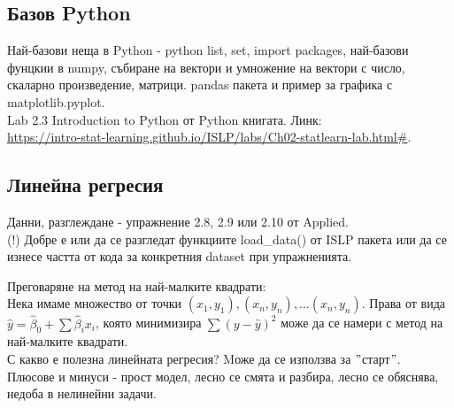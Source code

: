  	\subsection{Базов Python}
 	Най-базови неща в Python - python list, set, import packages, най-базови фунцкии в numpy,
 	събиране на вектори и умножение на вектори с число, скаларно произведение, матрици.
 	pandas пакета и пример за графика с matplotlib.pyplot.\\
 	
 	Lab 2.3 Introduction to Python от Python книгата. Линк: \\

 	\href{https://intro-stat-learning.github.io/ISLP/labs/Ch02-statlearn-lab.html#}{https://intro-stat-learning.github.io/ISLP/labs/Ch02-statlearn-lab.html\#}.
 	
	\subsection{Линейна регресия}
	
	
	
	Данни, разглеждане - упражнение 2.8, 2.9 или 2.10 от Applied. \\
	(!) Добре е или да се разгледат функциите load\_data() от ISLP пакета или
	да се изнесе частта от кода за конкретния dataset при упражненията.
	
	Преговаряне на метод на най-малките квадрати: \\
	Нека имаме множество от точки $(x_1,y_1), (x_n,y_n), \dots (x_n,y_n)$. 
	Права от вида $\hat y = \hat \beta_0 + \sum \hat \beta_i  x_i $, която минимизира $\sum (y-\hat{y})^2$  може да се намери с метод на най-малките квадрати. \\
	С какво е полезна линейната регресия? Mоже да се използва за $"$старт$"$.\\
	Плюсове и минуси - прост модел, лесно се смята и разбира, лесно се обяснява, недоба в нелинейни задачи. \\
	
